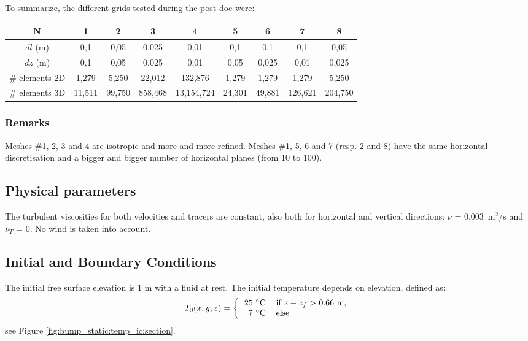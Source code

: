 To summarize, the different grids tested during the post-doc were:
\begin{small}
\begin{center}
\begin{tabular}{|c|c|c|c|c|c|c|c|c|}
\hline
N & 1 & 2 & 3 & 4 & 5 & 6 & 7 & 8\\
\hline 
$dl$ (m) & 0,1 & 0,05 & 0,025 & 0,01 & 0,1 & 0,1 & 0,1 & 0,05\\
\hline
$dz$ (m) & 0,1 & 0,05 & 0,025 & 0,01 & 0,05 & 0,025 & 0,01 & 0,025\\
\hline
\# elements 2D & 1,279 & 5,250 & 22,012 & 132,876 & 1,279 & 1,279 & 1,279 & 5,250\\
\hline
\# elements 3D & 11,511 & 99,750 & 858,468 & 13,154,724 & 24,301 & 49,881 & 126,621 & 204,750\\
\hline
\end{tabular}
\end{center}
\end{small}

\subsubsection{Remarks}
Meshes \#1, 2, 3 and 4 are isotropic and more and more refined.
Meshes \#1, 5, 6 and 7 (resp. 2 and 8) have the same horizontal discretisation
and a bigger and bigger number of horizontal planes (from 10 to 100).

\subsection{Physical parameters}
%
The turbulent viscosities for both velocities and tracers are constant,
also both for horizontal and vertical directions:
$\nu$ = 0.003~m$^2$/s and $\nu_T$ = 0.
No wind is taken into account.
%
\subsection{Initial and Boundary Conditions}
%
%
The initial free surface elevation is 1 m with a fluid at rest.
The initial temperature depends on elevation, defined as:
\begin{equation}
  T_0(x,y,z) = \left\{
  \begin{tabular}{rl}
    25 $^{\circ}$C & if $z-z_f >$ 0.66~m,\\
    7  $^{\circ}$C & else
  \end{tabular}
  \right.
\end{equation}
see Figure \ref{fig:bump_static:temp_ic:section}.

